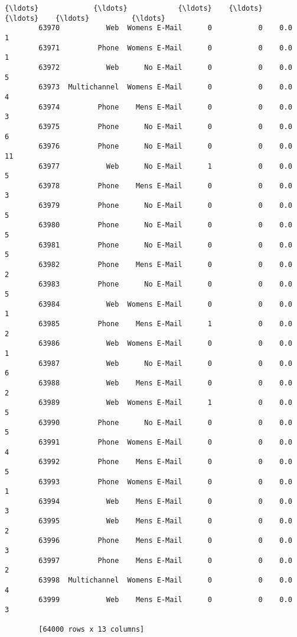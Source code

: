 \documentclass[11pt]{article}
\begin{document}
\begin{Verbatim}[commandchars=\\\{\}]
        {\ldots}             {\ldots}            {\ldots}    {\ldots}         {\ldots}    {\ldots}          {\ldots}  
        63970           Web  Womens E-Mail      0           0    0.0            1  
        63971         Phone  Womens E-Mail      0           0    0.0            1  
        63972           Web      No E-Mail      0           0    0.0            5  
        63973  Multichannel  Womens E-Mail      0           0    0.0            4  
        63974         Phone    Mens E-Mail      0           0    0.0            3  
        63975         Phone      No E-Mail      0           0    0.0            6  
        63976         Phone      No E-Mail      0           0    0.0           11  
        63977           Web      No E-Mail      1           0    0.0            5  
        63978         Phone    Mens E-Mail      0           0    0.0            3  
        63979         Phone      No E-Mail      0           0    0.0            5  
        63980         Phone      No E-Mail      0           0    0.0            5  
        63981         Phone      No E-Mail      0           0    0.0            5  
        63982         Phone    Mens E-Mail      0           0    0.0            2  
        63983         Phone      No E-Mail      0           0    0.0            5  
        63984           Web  Womens E-Mail      0           0    0.0            1  
        63985         Phone    Mens E-Mail      1           0    0.0            2  
        63986           Web  Womens E-Mail      0           0    0.0            1  
        63987           Web      No E-Mail      0           0    0.0            6  
        63988           Web    Mens E-Mail      0           0    0.0            2  
        63989           Web  Womens E-Mail      1           0    0.0            5  
        63990         Phone      No E-Mail      0           0    0.0            5  
        63991         Phone  Womens E-Mail      0           0    0.0            4  
        63992         Phone    Mens E-Mail      0           0    0.0            5  
        63993         Phone  Womens E-Mail      0           0    0.0            1  
        63994           Web    Mens E-Mail      0           0    0.0            3  
        63995           Web    Mens E-Mail      0           0    0.0            2  
        63996         Phone    Mens E-Mail      0           0    0.0            3  
        63997         Phone    Mens E-Mail      0           0    0.0            2  
        63998  Multichannel  Womens E-Mail      0           0    0.0            4  
        63999           Web    Mens E-Mail      0           0    0.0            3  
        
        [64000 rows x 13 columns]
\end{Verbatim}
            
\end{document}
